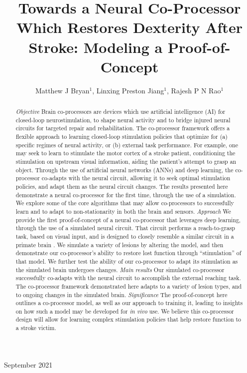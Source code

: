 \documentclass[12pt]{iopart}
\begin{document}
\title[Modeling a Neural Co-Processor]
{Towards a Neural Co-Processor Which Restores Dexterity After Stroke: Modeling a Proof-of-Concept}

\author{Matthew J Bryan$^{1}$, Linxing Preston Jiang$^{1}$, Rajesh P N Rao$^{1}$}

\address{$^{1}$ Neural Systems Laboratory, Department of Computer
Science and Engineering, University of Washington, Box 352350,
Seattle, WA 98105, USA}

\vspace{10pt}
\begin{indented}
\item[]September 2021
\end{indented}

\begin{abstract}
\textit{Objective} Brain co-processors \cite{rao.coproc} are devices which use artificial
intelligence (AI) for closed-loop neurostimulation, to shape neural activity and to bridge
injured neural circuits for targeted repair and rehabilitation. The co-processor framework
offers a flexible approach to learning closed-loop stimulation policies that optimize for
(a) specific regimes of neural activity, or (b) external task performance.
For example, one may seek to learn to stimulate the motor cortex of a stroke patient,
conditioning the stimulation on upstream visual information, aiding the patient's
attempt to grasp an object. Through the use of artificial neural
networks (ANNs) and deep learning, the co-processor co-adapts with the
neural circuit, allowing it to seek optimal stimulation policies, and adapt them
as the neural circuit changes. The results presented here demonstrate a
neural co-processor for the first time, through the use of a simulation. We
explore some of the core algorithms that may allow co-processors to successfully
learn and to adapt to non-stationarity in both the brain and sensors.
\textit{Approach} We provide the first proof-of-concept of a neural co-processor that
leverages deep learning, through the use of a simulated neural circuit.
That circuit performs a reach-to-grasp task, based on visual input, and is designed to
closely resemble a similar circuit in a primate brain \cite{michaels.mrnn}. We simulate
a variety of lesions by altering the model, and then demonstrate our co-processor's ability
to restore lost function through ``stimulation'' of that model. We further test the
ability of our co-processor to adapt its stimulation as the simulated brain undergoes changes.
\textit{Main results} Our simulated co-processor successfully co-adapts with the neural
circuit to accomplish the external reaching task. The co-processor framework
demonstrated here adapts to a variety of lesion types, and to ongoing changes in the
simulated brain.
\textit{Significance} The proof-of-concept here outlines a co-processor model, as well
as our approach to training it, leading to insights on how such a model may be
developed for \textit{in vivo} use. We believe this co-processor design will allow for
learning complex stimulation policies that help restore function to a stroke victim.
\end{abstract}
\end{document}
